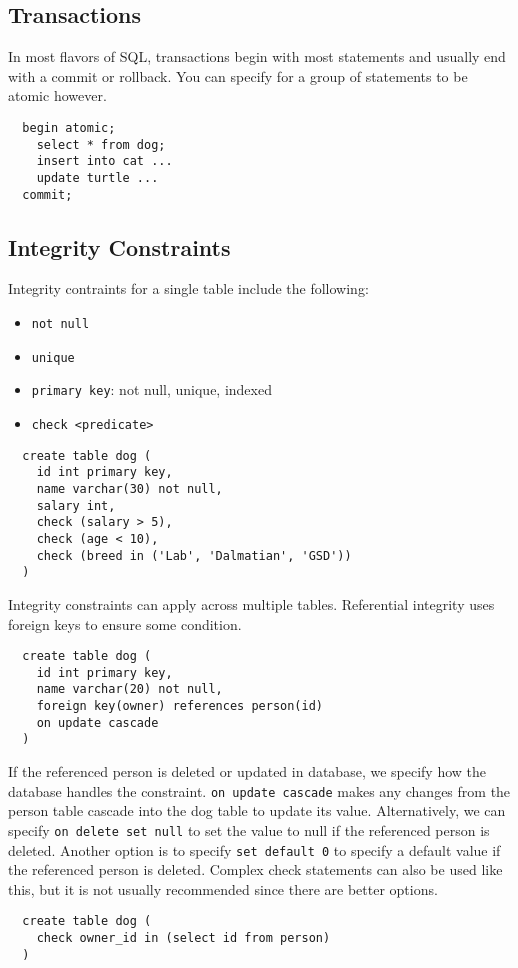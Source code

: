 \documentclass{math}
\begin{document}
\subsection*{Transactions}
In most flavors of SQL, transactions begin with most statements and usually end
with a commit or rollback. You can specify for a group of statements to be
atomic however.
\begin{lstlisting}
  begin atomic;
    select * from dog;
    insert into cat ...
    update turtle ...
  commit;
\end{lstlisting}

\subsection*{Integrity Constraints}
Integrity contraints for a single table include the following:
\begin{itemize}
  \item \texttt{not null}
  \item \texttt{unique}
  \item \texttt{primary key}: not null, unique, indexed
  \item \texttt{check \textless predicate\textgreater}
\end{itemize}
\begin{lstlisting}
  create table dog (
    id int primary key,
    name varchar(30) not null,
    salary int,
    check (salary > 5),
    check (age < 10),
    check (breed in ('Lab', 'Dalmatian', 'GSD'))
  )
\end{lstlisting}
Integrity constraints can apply across multiple tables. Referential integrity
uses foreign keys to ensure some condition.
\begin{lstlisting}
  create table dog (
    id int primary key,
    name varchar(20) not null,
    foreign key(owner) references person(id)
    on update cascade
  )
\end{lstlisting}
If the referenced person is deleted or updated in database, we specify how the
database handles the constraint. \texttt{on update cascade} makes any changes
from the person table cascade into the dog table to update its value.
Alternatively, we can specify \texttt{on delete set null} to set the value to
null if the referenced person is deleted. Another option is to specify
\texttt{set default 0} to specify a default value if the referenced person is
deleted. Complex check statements can also be used like this, but it is not
usually recommended since there are better options.
\begin{lstlisting}
  create table dog (
    check owner_id in (select id from person)
  )
\end{lstlisting}
\end{document}
